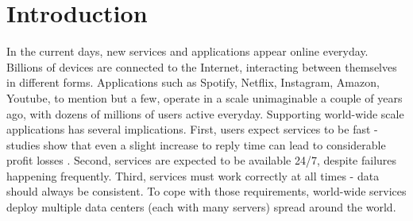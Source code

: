 
%

\chapter{Introduction}
\label{cha:introduction}





In the current days, new services and applications appear online everyday.
Billions of devices are connected to the Internet, interacting between themselves in different forms.
Applications such as Spotify, Netflix, Instagram, Amazon, Youtube, to mention but a few, operate in a scale unimaginable a couple of years ago, with dozens of millions of users active everyday.
Supporting world-wide scale applications has several implications.
First, users expect services to be fast - studies show that even a slight increase to reply time can lead to considerable profit losses \cite{dynamo, eiger, gomez, Schurman2009latency}.
Second, services are expected to be available 24/7, despite failures happening frequently.
Third, services must work correctly at all times - data should always be consistent.
To cope with those requirements, world-wide services deploy multiple data centers (each with many servers) spread around the world.

